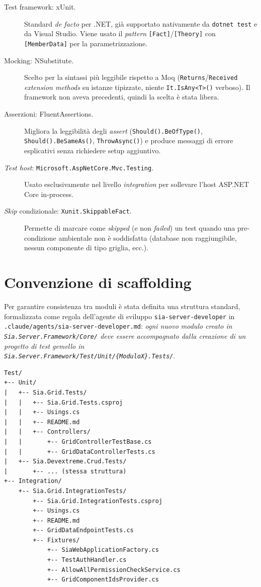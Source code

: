 \begin{description}
    \item[Test framework: xUnit.] Standard \emph{de facto} per .NET, già supportato nativamente da \texttt{dotnet test} e da Visual Studio. Viene usato il \emph{pattern} \texttt{[Fact]}/\texttt{[Theory]} con \texttt{[MemberData]} per la parametrizzazione.
    \item[Mocking: NSubstitute.] Scelto per la sintassi più leggibile rispetto a Moq (\texttt{Returns}/\texttt{Received} \emph{extension methods} su istanze tipizzate, niente \texttt{It.IsAny<T>()} verboso). Il framework non aveva precedenti, quindi la scelta è stata libera.
    \item[Asserzioni: FluentAssertions.] Migliora la leggibilità degli \emph{assert} (\texttt{Should().BeOfType()}, \texttt{Should().BeSameAs()}, \texttt{ThrowAsync()}) e produce messaggi di errore esplicativi senza richiedere setup aggiuntivo.
    \item[\emph{Test host}: \texttt{Microsoft.AspNetCore.Mvc.Testing}.] Usato esclusivamente nel livello \emph{integration} per sollevare l'host ASP.NET Core in-process.
    \item[\emph{Skip} condizionale: \texttt{Xunit.SkippableFact}.] Permette di marcare come \emph{skipped} (e non \emph{failed}) un test quando una pre-condizione ambientale non è soddisfatta (database non raggiungibile, nessun componente di tipo griglia, ecc.).
\end{description}

\section{Convenzione di scaffolding}

Per garantire consistenza tra moduli è stata definita una struttura standard, formalizzata come regola dell'agente di sviluppo \texttt{sia-server-developer} in \texttt{.claude/agents/sia-server-developer.md}: \emph{ogni nuovo modulo creato in \texttt{Sia.Server.Framework/Core/} deve essere accompagnato dalla creazione di un progetto di test gemello in \texttt{Sia.Server.Framework/Test/Unit/\{ModuloX\}.Tests/}}.

\begin{verbatim}
Test/
+-- Unit/
|   +-- Sia.Grid.Tests/
|   |   +-- Sia.Grid.Tests.csproj
|   |   +-- Usings.cs
|   |   +-- README.md
|   |   +-- Controllers/
|   |       +-- GridControllerTestBase.cs
|   |       +-- GridDataControllerTests.cs
|   +-- Sia.Devextreme.Crud.Tests/
|       +-- ... (stessa struttura)
+-- Integration/
    +-- Sia.Grid.IntegrationTests/
        +-- Sia.Grid.IntegrationTests.csproj
        +-- Usings.cs
        +-- README.md
        +-- GridDataEndpointTests.cs
        +-- Fixtures/
            +-- SiaWebApplicationFactory.cs
            +-- TestAuthHandler.cs
            +-- AllowAllPermissionCheckService.cs
            +-- GridComponentIdsProvider.cs
\end{verbatim}

